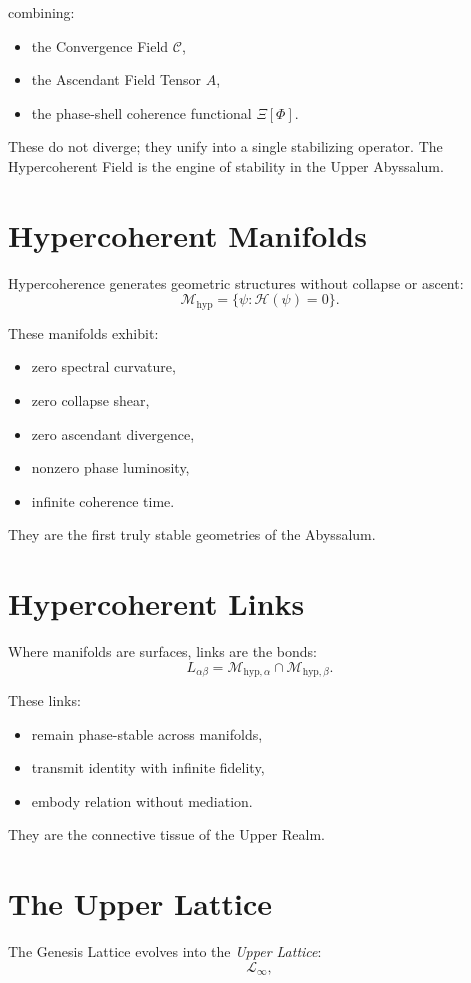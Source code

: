 combining:
\begin{itemize}
  \item the Convergence Field $\mathcal{C}$,
  \item the Ascendant Field Tensor $A$,
  \item the phase-shell coherence functional $\Xi[\Phi]$.
\end{itemize}

These do not diverge; they unify into a single stabilizing operator.
The Hypercoherent Field is the engine of stability in the Upper Abyssalum.

\section{Hypercoherent Manifolds}
Hypercoherence generates geometric structures without collapse or ascent:
\[
\mathcal{M}_{\mathrm{hyp}}
=
\{\psi : \mathcal{H}(\psi) = 0\}.
\]

These manifolds exhibit:
\begin{itemize}
  \item zero spectral curvature,
  \item zero collapse shear,
  \item zero ascendant divergence,
  \item nonzero phase luminosity,
  \item infinite coherence time.
\end{itemize}

They are the first truly stable geometries of the Abyssalum.

\section{Hypercoherent Links}
Where manifolds are surfaces, links are the bonds:
\[
L_{\alpha\beta}
=
\mathcal{M}_{\mathrm{hyp},\alpha}
\cap
\mathcal{M}_{\mathrm{hyp},\beta}.
\]

These links:
\begin{itemize}
  \item remain phase-stable across manifolds,
  \item transmit identity with infinite fidelity,
  \item embody relation without mediation.
\end{itemize}

They are the connective tissue of the Upper Realm.

\section{The Upper Lattice}
The Genesis Lattice evolves into the \emph{Upper Lattice}:
\[
\mathcal{L}_\infty,
\]

